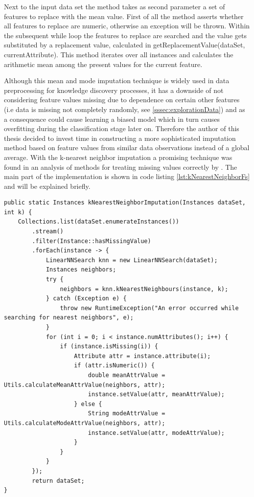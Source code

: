 Next to the input data set the method takes as second parameter a set of features to replace with the mean value. First of all the method asserts whether all features to replace are numeric, otherwise an exception will be thrown. Within the subsequent while loop the features to replace are searched and the value gets substituted by a replacement value, calculated in getReplacementValue(dataSet, currentAttribute). This method iterates over all instances and calculates the arithmetic mean among the present values for the current feature.

Although this mean and mode imputation technique is widely used in data preprocessing for knowledge discovery processes, it has a downside of not considering feature values missing due to dependence on certain other features (i.e data is missing not completely randomly, see \ref{sssec:explorationData}) and as a consequence could cause learning a biased model which in turn causes overfitting during the classification stage later on. Therefore the author of this thesis decided to invest time in constructing a more sophisticated imputation method based on feature values from similar data observations instead of a global average. With the k-nearest neighbor imputation a  promising technique was found in an analysis of methods for treating missing values correctly by \cite{batista2003analysis}. The main part of the implementation is shown in code listing \ref{lst:kNearestNeighborFs} and will be explained briefly. 

\begin{lstlisting}[caption={Mean and mode imputation of missing values}, label={lst:meanImputation}]
public static Instances kNearestNeighborImputation(Instances dataSet, int k) {
	Collections.list(dataSet.enumerateInstances())
		.stream()
		.filter(Instance::hasMissingValue)
		.forEach(instance -> {
			LinearNNSearch knn = new LinearNNSearch(dataSet);
			Instances neighbors;
			try {
				neighbors = knn.kNearestNeighbours(instance, k);
			} catch (Exception e) {
				throw new RuntimeException("An error occurred while searching for nearest neighbors", e);
			}
			for (int i = 0; i < instance.numAttributes(); i++) {
				if (instance.isMissing(i)) {
					Attribute attr = instance.attribute(i);
					if (attr.isNumeric()) {
						double meanAttrValue = Utils.calculateMeanAttrValue(neighbors, attr);
						instance.setValue(attr, meanAttrValue);
					} else {
						String modeAttrValue = Utils.calculateModeAttrValue(neighbors, attr);
						instance.setValue(attr, modeAttrValue);
					}
				}
			}
		});
		return dataSet;
}
\end{lstlisting}

